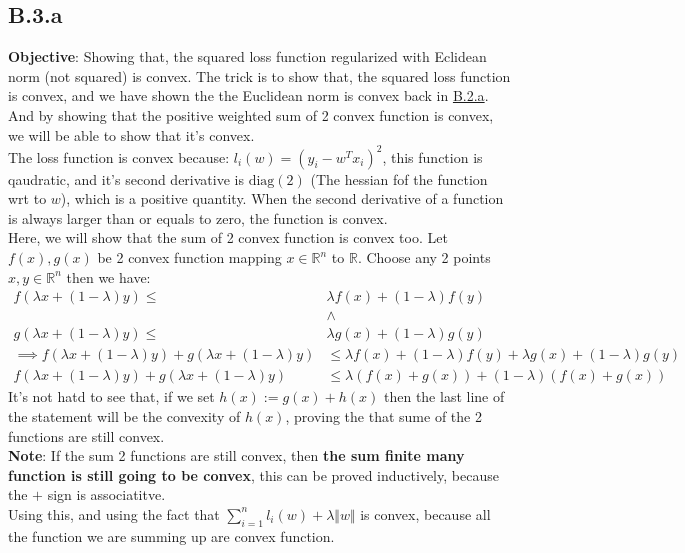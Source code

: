 \documentclass[]{article}
\begin{document}
    \subsection*{B.3.a}
        \textbf{Objective}: Showing that, the squared loss function regularized with Eclidean norm (not squared) is convex. The trick is to show that, the squared loss function is convex, and we have shown the the Euclidean norm is convex back in \hyperref[B.2.a]{B.2.a}. And by showing that the positive weighted sum of 2 convex function is convex, we will be able to show that it's convex. 
        \\
        The loss function is convex because: $l_i(w) = (y_i - w^Tx_i)^2$, this function is qaudratic, and it's second derivative is $\text{diag}(2)$ (The hessian fof the function wrt to $w$), which is a positive quantity. When the second derivative of a function is always larger than or equals to zero, the function is convex. 
        \\
        Here, we will show that the sum of 2 convex function is convex too. Let $f(x), g(x)$ be 2 convex function mapping $x\in \mathbb{R}^n$ to $\mathbb{R}$. Choose any 2 points $x, y\in \mathbb{R}^n$ then we have: 
        \begin{align*}\tag{B.3.a.1}\label{eqn:B.3.a.1}
            f(\lambda x + (1 - \lambda)y) \le& \lambda f(x) + (1 - \lambda)f(y) 
            \\
            & \wedge
            \\
            g(\lambda x + (1 - \lambda)y) \le& \lambda g(x) + (1 - \lambda)g(y) 
            \\
            \implies 
            f(\lambda x + (1 - \lambda)y) + g(\lambda x + (1 - \lambda)y)
            &\le \lambda f(x) + (1 - \lambda)f(y) +  \lambda g(x) + (1 - \lambda)g(y) 
            \\
            f(\lambda x + (1 - \lambda)y) + g(\lambda x + (1 - \lambda)y)
            &\le
            \lambda (f(x) + g(x)) + (1 - \lambda) (f(x) + g(x))
        \end{align*}
    It's not hatd to see that, if we set $h(x) := g(x) + h(x)$ then the last line of the statement will be the convexity of $h(x)$, proving the that sume of the 2 functions are still convex. 
    \\
    \textbf{Note}: If the sum 2 functions are still convex, then \textbf{the sum finite many function is still going to be convex}, this can be proved inductively, because the $+$ sign is associatitve.  
    \\
    Using this, and using the fact that $\sum_{i = 1}^{n} l_i(w) + \lambda\Vert w\Vert$ is convex, because all the function we are summing up are convex function.
\end{document}
